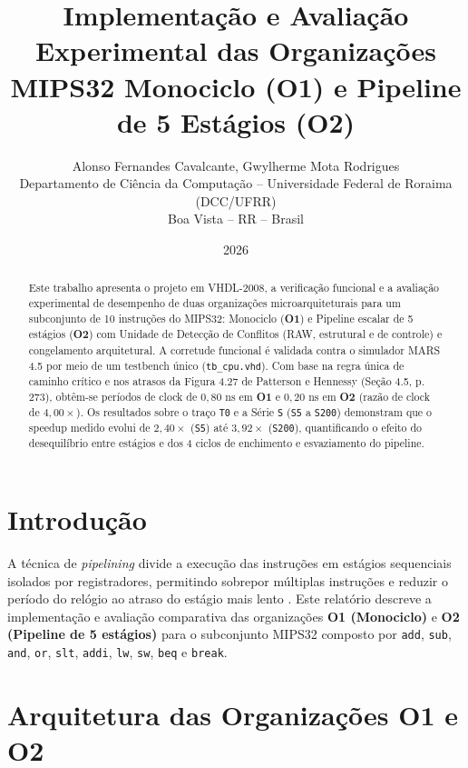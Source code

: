 \documentclass[12pt]{article}
\title{\textbf{Implementação e Avaliação Experimental das Organizações MIPS32 Monociclo (O1) e Pipeline de 5 Estágios (O2)}}
\author{Alonso Fernandes Cavalcante, Gwylherme Mota Rodrigues\\
Departamento de Ciência da Computação -- Universidade Federal de Roraima (DCC/UFRR)\\
Boa Vista -- RR -- Brasil}
\date{2026}
\begin{document}
\maketitle

\begin{abstract}
Este trabalho apresenta o projeto em VHDL-2008, a verificação funcional e a avaliação experimental de desempenho de duas organizações microarquiteturais para um subconjunto de 10 instruções do MIPS32: Monociclo (\textbf{O1}) e Pipeline escalar de 5 estágios (\textbf{O2}) com Unidade de Detecção de Conflitos (RAW, estrutural e de controle) e congelamento arquitetural. A corretude funcional é validada contra o simulador MARS 4.5 por meio de um testbench único (\texttt{tb\_cpu.vhd}). Com base na regra única de caminho crítico e nos atrasos da Figura 4.27 de Patterson e Hennessy (Seção 4.5, p. 273), obtêm-se períodos de clock de $0{,}80\text{ ns}$ em \textbf{O1} e $0{,}20\text{ ns}$ em \textbf{O2} (razão de clock de $4{,}00\times$). Os resultados sobre o traço \texttt{T0} e a Série \texttt{S} (\texttt{S5} a \texttt{S200}) demonstram que o speedup medido evolui de $2{,}40\times$ (\texttt{S5}) até $3{,}92\times$ (\texttt{S200}), quantificando o efeito do desequilíbrio entre estágios e dos 4 ciclos de enchimento e esvaziamento do pipeline.
\end{abstract}

\section{Introdução}
A técnica de \textit{pipelining} divide a execução das instruções em estágios sequenciais isolados por registradores, permitindo sobrepor múltiplas instruções e reduzir o período do relógio ao atraso do estágio mais lento \cite{patterson2017}. Este relatório descreve a implementação e avaliação comparativa das organizações \textbf{O1 (Monociclo)} e \textbf{O2 (Pipeline de 5 estágios)} para o subconjunto MIPS32 composto por \texttt{add}, \texttt{sub}, \texttt{and}, \texttt{or}, \texttt{slt}, \texttt{addi}, \texttt{lw}, \texttt{sw}, \texttt{beq} e \texttt{break}.

\section{Arquitetura das Organizações O1 e O2}
\end{document}
